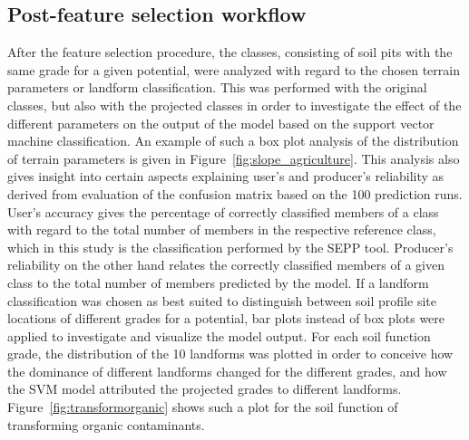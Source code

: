 \documentclass[soilsystems,article,submit,moreauthors,pdftex,10pt,a4paper]{Definitions/mdpi}
\begin{document}
\subsection{Post-feature selection workflow}
After the feature selection procedure, the classes, consisting of soil pits with the same grade for a given potential, were analyzed with regard to the chosen terrain parameters or landform classification. This was performed with the original classes, but also with the projected classes in order to investigate the effect of the different parameters on the output of the model based on the support vector machine classification. An example of such a box plot analysis of the distribution of terrain parameters is given in Figure~\ref{fig:slope_agriculture}. This analysis also gives insight into certain aspects explaining user's and producer's reliability as derived from evaluation of the confusion matrix based on the 100 prediction runs.  User's accuracy gives the percentage of correctly classified members of a class with regard to the total number of members in the respective reference class, which in this study is the classification performed by the SEPP tool. Producer's reliability on the other hand relates the correctly classified members of a given class to the total number of members predicted by the model.
If a landform classification was chosen as best suited to distinguish between soil profile site locations of different grades for a potential, bar plots instead of box plots were applied to investigate and visualize the model output. For each soil function grade, the distribution of the 10 landforms was plotted in order to conceive how the dominance of different landforms changed for the different grades, and how the SVM model attributed the projected grades to different landforms. Figure~\ref{fig:transformorganic} shows such a plot for the soil function of transforming organic contaminants.
\end{document}
